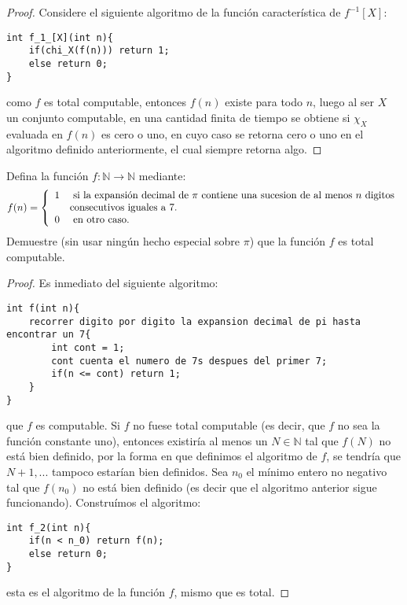 \documentclass[12pt]{report}
\newcounter{it}
\theoremstyle{largebreak}
\newcommand\cf[3]{\ensuremath{#1:#2\rightarrow#3}}
\begin{document}
    \begin{proof}
        Considere el siguiente algoritmo de la función característica de $f^{-1}[X]$:

        \begin{lstlisting}
int f_1_[X](int n){
    if(chi_X(f(n))) return 1;
    else return 0;
}
        \end{lstlisting}
        como $f$ es total computable, entonces $f(n)$ existe para todo $n$, luego al ser $X$ un conjunto computable, en una cantidad finita de tiempo se obtiene si $\chi_X$ evaluada en $f(n)$ es cero o uno, en cuyo caso se retorna cero o uno en el algoritmo definido anteriormente, el cual siempre retorna algo.
    \end{proof}

    \begin{excer}
        Defina la función $\cf{f}{\mathbb{N}}{\mathbb{N}}$ mediante:
        \begin{equation*}
            f(n)=\left\{
                \begin{array}{rl}
                    1 & \textup{ si la expansión decimal de $\pi$ contiene una sucesion de al menos $n$ digitos}\\ 
                     & \textup{consecutivos iguales a 7.}\\
                    0 & \textup{ en otro caso.}\\
                \end{array}
            \right.
        \end{equation*}
        Demuestre (sin usar ningún hecho especial sobre $\pi$) que la función $f$ es total computable.
    \end{excer}

    \begin{proof}
        Es inmediato del siguiente algoritmo:
        \begin{lstlisting}
int f(int n){
    recorrer digito por digito la expansion decimal de pi hasta encontrar un 7{
        int cont = 1;
        cont cuenta el numero de 7s despues del primer 7;
        if(n <= cont) return 1;
    }
}
        \end{lstlisting}
        que $f$ es computable. Si $f$ no fuese total computable (es decir, que $f$ no sea la función constante uno), entonces existiría al menos un $N\in\mathbb{N}$ tal que $f(N)$ no está bien definido, por la forma en que definimos el algoritmo de $f$, se tendría que $N+1,...$ tampoco estarían bien definidos. Sea $n_0$ el mínimo entero no negativo tal que $f(n_0)$ no está bien definido (es decir que el algoritmo anterior sigue funcionando). Construímos el algoritmo:
        \begin{lstlisting}
int f_2(int n){
    if(n < n_0) return f(n);
    else return 0;
}
        \end{lstlisting}
        esta es el algoritmo de la función $f$, mismo que es total.
    \end{proof}
\end{document}
